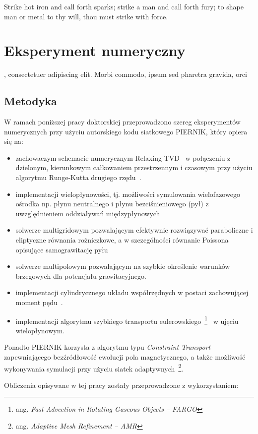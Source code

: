 \begin{savequote}[75mm]
Strike hot iron and call forth sparks; strike a man and call forth fury; to shape man or metal to thy will, thou must
strike with force.
\end{savequote}

\chapter{Eksperyment numeryczny}
, consectetuer adipiscing elit. Morbi commodo, ipsum sed pharetra gravida, orci
\section{Metodyka}
W ramach poniższej pracy doktorskiej przeprowadzono szereg eksperymentów
numerycznych przy użyciu autorskiego kodu siatkowego PIERNIK, który opiera się
na:
\begin{itemize}
   \item zachowaczym schemacie numerycznym Relaxing TVD~\cite{jin-xin-95} w
      połączeniu z dzielonym, kierunkowym całkowaniem przestrzennym i czasowym
      przy użyciu algorytmu Runge-Kutta drugiego
      rzędu~\cite{2003PASP..115..303T,2003ApJS..149..447P}.
   \item implementacji wielopłynowości, tj. możliwości symulowania wielofazowego
      ośrodka np. płynu neutralnego i płynu bezciśnieniowego (pył) z
      uwzględnieniem oddziaływań międzypłynowych~\cite{piernik1,piernik2}
   \item solwerze multigridowym pozwalającym efektywnie rozwiązywać paraboliczne
      i eliptyczne równania rożniczkowe, a w szczególności równanie Poissona
      opisujące samograwitację pyłu
   \item solwerze multipolowym pozwalającym na szybkie określenie warunków
      brzegowych dla potencjału grawitacyjnego.
   \item implementacji cylindrycznego układu współrzędnych w postaci
      zachowującej moment pędu~\cite{M07,SO10}.
   \item implementacji algorytmu szybkiego transportu
      eulerowskiego~\footnote{ang. \emph{Fast Advection in Rotating Gaseous Objects --
      FARGO}}~\citep{fargo} w ujęciu wielopłynowym.

\end{itemize}
Ponadto PIERNIK korzysta z algorytmu typu \emph{Constraint Transport}
zapewniającego bezźródłowość ewolucji pola magnetycznego, a także możliwość
wykonywania symulacji przy użyciu siatek adaptywnych~\footnote{ang.
\emph{Adaptive Mesh Refinement -- AMR}}.
\par Obliczenia opisywane w tej pracy zostały przeprowadzone z
wykorzystaniem:

